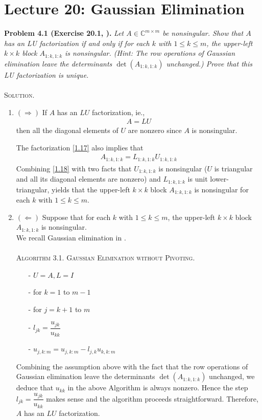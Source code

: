 \documentclass[a4paper,oneside]{book}
\numberwithin{equation}{chapter}
\begin{document}
\section{Lecture 20: Gaussian Elimination}
\textbf{Problem 4.1 (Exercise 20.1, \cite{1}).} \textit{Let $A \in \mathbb{C}^{m\times m}$ be nonsingular. Show that $A$ has an LU factorization if and only if for each $k$ with $1\le k \le m$, the upper-left $k\times k$ block ${A_{1:k,1:k}}$ is nonsingular. (Hint: The row operations of Gaussian elimination leave the determinants $\det \left( {{A_{1:k,1:k}}} \right)$ unchanged.) Prove that this LU factorization is unique.}\\
\\
\textsc{Solution.} 
\begin{enumerate}
\item $\left(  \Rightarrow  \right)$ If $A$ has an $LU$ factorization, ie.,
\begin{align}
\label{1.17}
A = LU
\end{align}
then all the diagonal elements of $U$ are nonzero since $A$ is nonsingular. 

The factorization \eqref{1.17} also implies that
\begin{align}
\label{1.18}
{A_{1:k,1:k}} = {L_{1:k,1:k}}{U_{1:k,1:k}}
\end{align}
Combining \eqref{1.18} with two facts that $U_{1:k,1:k}$ is nonsingular ($U$ is triangular and all its diagonal elements are nonzero) and $L_{1:k,1:k}$ is unit lower-triangular, yields that the upper-left $k\times k$ block $A_{1:k,1:k}$ is nonsingular for each $k$ with $1\le k \le m$. 
\item $\left(  \Leftarrow  \right)$ Suppose that for each $k$ with $1 \le k \le m$, the upper-left $k\times k$ block $A_{1:k,1:k}$ is nonsingular. \\
We recall Gaussian elimination in \cite{1}.\\
\\
\textsc{Algorithm 3.1. Gaussian Elimination without Pivoting.}
\begin{itemize}
\item[-] $U=A,L=I$
\item[-] for $k=1$ to $m-1$
\item[-] \hspace{1cm} for $j=k+1$ to $m$
\item[-] \hspace{2cm} ${l_{jk}} = \dfrac{{{u_{jk}}}}{{{u_{kk}}}}$
\item[-] \hspace{2cm} ${u_{j,k:m}} = {u_{j,k:m}} - {l_{j,k}}{u_{k,k:m}}$
\end{itemize}
\vspace{0.5cm}
Combining the assumption above with the fact that the row operations of Gaussian elimination leave the determinants $\det \left( {{A_{1:k,1:k}}} \right)$ unchanged, we deduce that $u_{kk}$ in the above Algorithm is always nonzero. Hence the step ${l_{jk}} = \dfrac{{{u_{jk}}}}{{{u_{kk}}}}$ makes sense and the algorithm proceeds straightforward. Therefore, $A$ has an $LU$ factorization.
\end{enumerate}
\end{document}
